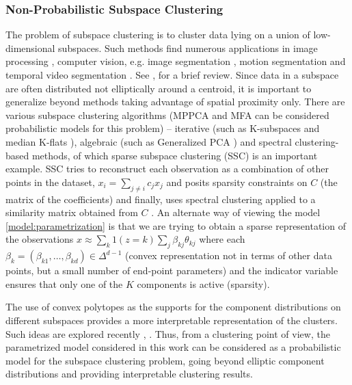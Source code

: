 \documentclass[bj,authoryear]{imsart}
\theoremstyle{plain}
\theoremstyle{remark}
\begin{document}
\begin{appendix}
\subsubsection*{Non-Probabilistic Subspace Clustering}
The problem of subspace clustering is to cluster data lying on a union of low-dimensional subspaces. Such methods find numerous applications in image processing \cite{hong2006multiscale}, computer vision, e.g. image segmentation \cite{yang2008unsupervised}, motion segmentation and temporal video segmentation \cite{kanatani2001motion}. See \cite{parsons2004subspace},\cite{elhamifar2013sparse} for a brief review. Since data in a subspace are often distributed not elliptically around a centroid, it is important to generalize beyond methods taking advantage of spatial proximity only. There are various subspace clustering algorithms (MPPCA and MFA can be considered probabilistic models for this problem) -- iterative (such as K-subspaces \cite{tseng2000nearest} and median K-flats \cite{zhang2009median}), algebraic (such as Generalized PCA \cite{vidal2005generalized}) and spectral clustering-based methods, of which sparse subspace clustering (SSC) is an important example. SSC tries to reconstruct each observation as a combination of other points in the dataset, $x_i = \sum_{j\neq i} c_j x_j$ and posits sparsity constraints on $C$ (the matrix of the coefficients) and finally, uses spectral clustering applied to a similarity matrix obtained from $C$ \cite{elhamifar2013sparse}. An alternate way of viewing the model \eqref{model:parametrization} is that we are trying to obtain a sparse representation of the observations $x \approx \sum_k 1(z=k)\sum_j \beta_{kj} \theta_{kj}$
where each $\beta_k=(\beta_{k1},\dots,\beta_{kd})\in\Delta^{d-1}$ (convex representation not in terms of other data points, but a small number of end-point parameters) and the indicator variable ensures that only one of the $K$ components is active (sparsity). 

The use of convex polytopes as the supports for the component distributions on different subspaces provides a more interpretable representation of the clusters. Such ideas are explored recently \cite{lawless2022interpretable}, \cite{lawless2023cluster}. Thus, from a clustering point of view, the parametrized model considered in this work can be considered as a probabilistic model for the subspace clustering problem, going beyond elliptic component distributions and providing interpretable clustering results. 


\end{appendix}
\end{document}
